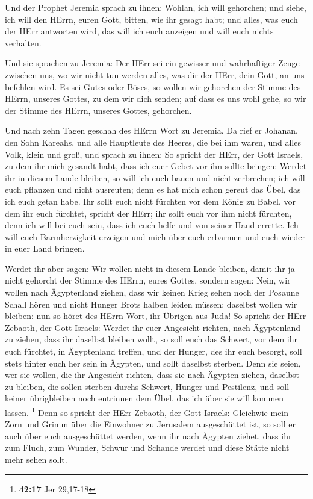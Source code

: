  Und der Prophet Jeremia sprach zu ihnen: Wohlan, ich will
gehorchen; und siehe, ich will den HErrn, euren Gott, bitten, wie ihr
gesagt habt; und alles, was euch der HErr antworten wird, das will ich
euch anzeigen und will euch nichts verhalten.

 Und sie sprachen zu Jeremia: Der HErr sei ein gewisser und
wahrhaftiger Zeuge zwischen uns, wo wir nicht tun werden alles, was dir
der HErr, dein Gott, an uns befehlen wird.  Es sei Gutes
oder Böses, so wollen wir gehorchen der Stimme des HErrn, unseres
Gottes, zu dem wir dich senden; auf dass es uns wohl gehe, so wir der
Stimme des HErrn, unseres Gottes, gehorchen.

 Und nach zehn Tagen geschah des HErrn Wort zu Jeremia.
 Da rief er Johanan, den Sohn Kareahs, und alle Hauptleute
des Heeres, die bei ihm waren, und alles Volk, klein und groß,
 und sprach zu ihnen: So spricht der HErr, der Gott Israels,
zu dem ihr mich gesandt habt, dass ich euer Gebet vor ihn sollte
bringen:  Werdet ihr in diesem Lande bleiben, so will ich
euch bauen und nicht zerbrechen; ich will euch pflanzen und nicht
ausreuten; denn es hat mich schon gereut das Übel, das ich euch getan
habe.  Ihr sollt euch nicht fürchten vor dem König zu
Babel, vor dem ihr euch fürchtet, spricht der HErr; ihr sollt euch vor
ihm nicht fürchten, denn ich will bei euch sein, dass ich euch helfe und
von seiner Hand errette.  Ich will euch Barmherzigkeit
erzeigen und mich über euch erbarmen und euch wieder in euer Land
bringen.

 Werdet ihr aber sagen: Wir wollen nicht in diesem Lande
bleiben, damit ihr ja nicht gehorcht der Stimme des HErrn, eures Gottes,
 sondern sagen: Nein, wir wollen nach Ägyptenland ziehen,
dass wir keinen Krieg sehen noch der Posaune Schall hören und nicht
Hunger Brots halben leiden müssen; daselbst wollen wir bleiben:
 nun so höret des HErrn Wort, ihr Übrigen aus Juda! So
spricht der HErr Zebaoth, der Gott Israels: Werdet ihr euer Angesicht
richten, nach Ägyptenland zu ziehen, dass ihr daselbst bleiben wollt,
 so soll euch das Schwert, vor dem ihr euch fürchtet, in
Ägyptenland treffen, und der Hunger, des ihr euch besorgt, soll stets
hinter euch her sein in Ägypten, und sollt daselbst sterben.
 Denn sie seien, wer sie wollen, die ihr Angesicht richten,
dass sie nach Ägypten ziehen, daselbst zu bleiben, die sollen sterben
durchs Schwert, Hunger und Pestilenz, und soll keiner übrigbleiben noch
entrinnen dem Übel, das ich über sie will kommen lassen. \footnote{\textbf{42:17}
  Jer 29,17-18}  Denn so spricht der HErr Zebaoth, der Gott
Israels: Gleichwie mein Zorn und Grimm über die Einwohner zu Jerusalem
ausgeschüttet ist, so soll er auch über euch ausgeschüttet werden, wenn
ihr nach Ägypten ziehet, dass ihr zum Fluch, zum Wunder, Schwur und
Schande werdet und diese Stätte nicht mehr sehen sollt.

